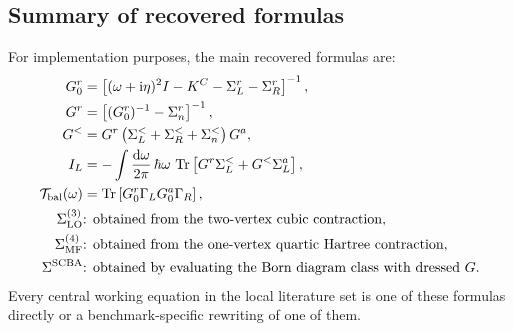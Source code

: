 \subsection{Summary of recovered formulas}
For implementation purposes, the main recovered formulas are:
\begin{align}
    G_0^r &= \left[ (\omega+\mathrm{i}\eta)^2 I - K^C - \Sigma_L^r - \Sigma_R^r \right]^{-1}, \\
    G^r &= \left[ (G_0^r)^{-1} - \Sigma_n^r \right]^{-1}, \\
    G^< &= G^r\left( \Sigma_L^< + \Sigma_R^< + \Sigma_n^< \right)G^a, \\
    I_L &= -\int \frac{\mathrm{d}\omega}{2\pi}\,\hbar\omega\,\operatorname{Tr}\left[ G^r\Sigma_L^< + G^<\Sigma_L^a \right], \\
    \mathcal T_{\rm bal}(\omega) &= \operatorname{Tr}\left[ G_0^r\Gamma_L G_0^a\Gamma_R \right], \\
    \Sigma^{(3)}_{\rm LO} &\text{: obtained from the two-vertex cubic contraction}, \\
    \Sigma^{(4)}_{\rm MF} &\text{: obtained from the one-vertex quartic Hartree contraction}, \\
    \Sigma^{\rm SCBA} &\text{: obtained by evaluating the Born diagram class with dressed } G.
\end{align}
Every central working equation in the local literature set is one of these formulas directly or a benchmark-specific rewriting of one of them.
